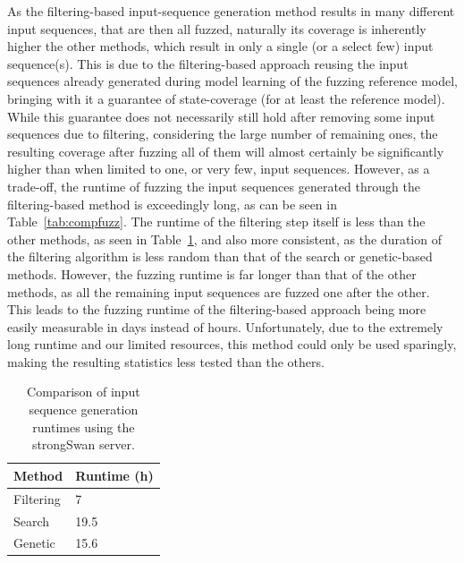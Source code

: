 As the filtering-based input-sequence generation method results in many different input sequences, that are then all fuzzed, naturally its coverage is inherently higher the other methods, which result in only a single (or a select few) input sequence(s). This is due to the filtering-based approach reusing the input sequences already generated during model learning of the fuzzing reference model, bringing with it a guarantee of state-coverage (for at least the reference model). While this guarantee does not necessarily still hold after removing some input sequences due to filtering, considering the large number of remaining ones, the resulting coverage after fuzzing all of them will almost certainly be significantly higher than when limited to one, or very few, input sequences. However, as a trade-off, the runtime of fuzzing the input sequences generated through the filtering-based method is exceedingly long, as can be seen in Table~\ref{tab:compfuzz}. The runtime of the filtering step itself is less than the other methods, as seen in Table~\ref{tab:comprun}, and also more consistent, as the duration of the filtering algorithm is less random than that of the search or genetic-based methods. However, the fuzzing runtime is far longer than that of the other methods, as all the remaining input sequences are fuzzed one after the other. This leads to the fuzzing runtime of the filtering-based approach being more easily measurable in days instead of hours. Unfortunately, due to the extremely long runtime and our limited resources, this method could only be used sparingly, making the resulting statistics less tested than the others. 

\vspace{3mm}
\begin{table}[H]
	\centering
	\begin{tabular}{|l|l|}
		\hline
		\rowcolor[HTML]{EFEFEF} 
		\textbf{Method} & \textbf{Runtime (h)}   \\ \hline
		Filtering		            &  7	     \\ \hline
		Search              		&  19.5      \\ \hline
		Genetic              		&  15.6       \\ \hline
	\end{tabular}
	\caption{Comparison of input sequence generation runtimes using the strongSwan server.}
	\label{tab:comprun}
\end{table}

